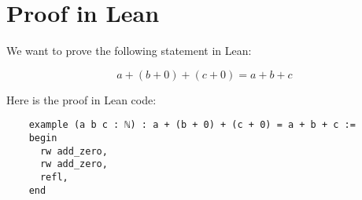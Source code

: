 \documentclass{article}
\begin{document}
    
    \section*{Proof in Lean}
    
    We want to prove the following statement in Lean:
    
    \[
    a + (b + 0) + (c + 0) = a + b + c
    \]
    
    Here is the proof in Lean code:
    
    \begin{lstlisting}
    example (a b c : ℕ) : a + (b + 0) + (c + 0) = a + b + c :=
    begin
      rw add_zero,
      rw add_zero,
      refl,
    end
    \end{lstlisting}
    
    
\end{document}
